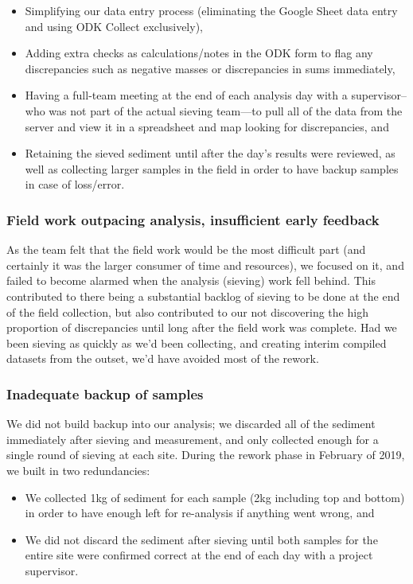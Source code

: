 \documentclass[a4paper,12pt,twoside]{article}
\begin{document}
\begin{itemize}
  \item Simplifying our data entry process (eliminating the Google Sheet data entry and using ODK Collect exclusively),
  \item Adding extra checks as calculations/notes in the ODK form to flag any discrepancies such as negative masses or discrepancies in sums immediately,
  \item Having a full-team meeting at the end of each analysis day with a supervisor--who was not part of the actual sieving team---to pull all of the data from the server and view it in a spreadsheet and map looking for discrepancies, and
  \item Retaining the sieved sediment until after the day's results were reviewed, as well as collecting larger samples in the field in order to have backup samples in case of loss/error.
\end{itemize}

\color{RHblue}
\subsubsection{Field work outpacing analysis, insufficient early feedback}
\color{RHgrey}
As the team felt that the field work would be the most difficult part (and certainly it was the larger consumer of time and resources), we focused on it, and failed to become alarmed when the analysis (sieving) work fell behind. This contributed to there being a substantial backlog of sieving to be done at the end of the field collection, but also contributed to our not discovering the high proportion of discrepancies until long after the field work was complete. Had we been sieving as quickly as we'd been collecting, and creating interim compiled datasets from the outset, we'd have avoided most of the rework.

\color{RHblue}
\subsubsection{Inadequate backup of samples}
\color{RHgrey}
We did not build backup into our analysis; we discarded all of the sediment immediately after sieving and measurement, and only collected enough for a single round of sieving at each site. During the rework phase in February of 2019, we built in two redundancies:

\begin{itemize}
  \item We collected 1kg of sediment for each sample (2kg including top and bottom) in order to have enough left for re-analysis if anything went wrong, and
  \item We did not discard the sediment after sieving until both samples for the entire site were confirmed correct at the end of each day with a project supervisor.
\end{itemize}
\end{document}
